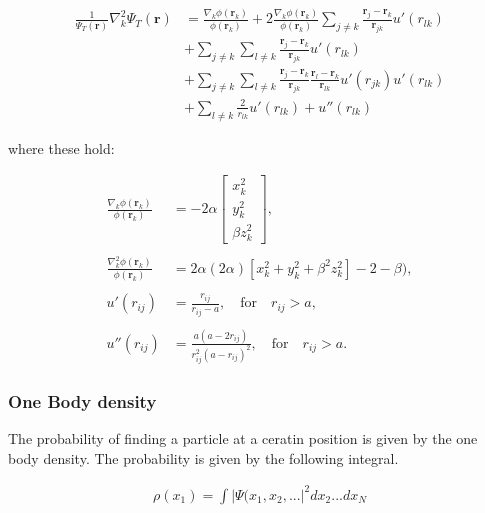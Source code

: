 \documentclass[
]{article}
\begin{document}
\begin{align*}
\frac{1}{\Psi_T(\mathbf{r})} \nabla_k^2 \Psi_T(\mathbf{r}) &= \frac{\nabla_k \phi(\mathbf{r}_k)}{\phi(\mathbf{r}_k)} + 2 \frac{\nabla_k \phi(\mathbf{r}_k)}{\phi(\mathbf{r}_k)}\sum _{j\ne k}
\frac{\mathbf{r}_j - \mathbf {r}_k}{\mathbf{r} _{jk}}u'(r _{lk})\\
&+ \sum _{j\ne k}\sum _{l\ne k}
\frac{\mathbf{r}_j - \mathbf {r}_k}{\mathbf{r} _{jk}} u'(r _{lk}) \\
&+ \sum _{j\ne k}\sum _{l\ne k}
\frac{\mathbf{r}_j - \mathbf {r}_k}{\mathbf{r} _{jk}} \frac{\mathbf{r}_l - \mathbf {r}_k}{\mathbf{r} _{lk}}  u'(r _{jk})  u'(r _{lk}) \\
&+ \sum _{l\ne k} \frac{2}{r _{lk}} u'(r _{lk}) +  u''(r _{lk})
\end{align*}

where these hold:

\begin{align*}
\frac{\nabla_k \phi(\mathbf{r}_k)}{\phi(\mathbf{r}_k)} &= -2\alpha \left[
\begin{matrix}
x_k^2 \\ y_k^2 \\ \beta z_k^2
\end{matrix}\right], \\ \\
\frac{\nabla_k^2 \phi(\mathbf{r}_k)}{\phi(\mathbf{r}_k)} &= 2\alpha (2\alpha)[x_k^2 + y_k^2 + \beta^2z_k^2] - 2 - \beta),\\ \\
u'(r_{ij}) &= \frac{r_{ij}}{r_{ij}-a}, \quad \text{for}  \quad r_{ij}  > a, \\ \\
u''(r_{ij}) &= \frac{a(a-2r_{ij})}{r_{ij}^2(a-r_{ij})^2}, \quad \text{for} \quad r_{ij}  > a.
\end{align*}

\hypertarget{one-body-density}{%
\subsubsection{One Body density}\label{one-body-density}}

The probability of finding a particle at a ceratin position is given by
the one body density. The probability is given by the following
integral.

\begin{align*}
  \rho(x_1) = \int{|\Psi(x_1, x_2,...|^2 dx_2 ...dx_N}
\end{align*}
\end{document}
